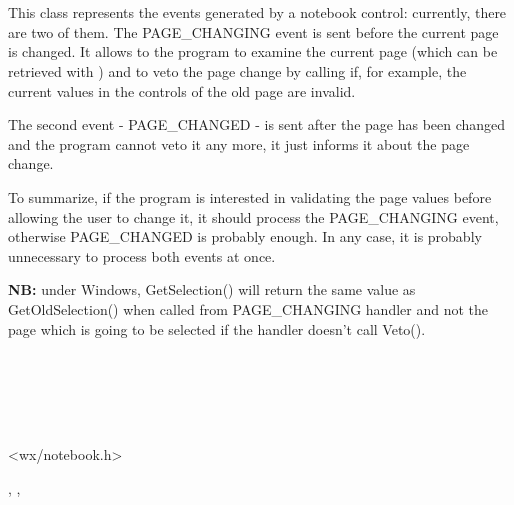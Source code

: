 \section{}\label{wxnotebookevent}

This class represents the events generated by a notebook control: currently,
there are two of them. The PAGE\_CHANGING event is sent before the current
page is changed. It allows to the program to examine the current page (which
can be retrieved with 
) and to veto the page
change by calling  if, for example, the
current values in the controls of the old page are invalid.

The second event - PAGE\_CHANGED - is sent after the page has been changed and
the program cannot veto it any more, it just informs it about the page change.

To summarize, if the program is interested in validating the page values
before allowing the user to change it, it should process the PAGE\_CHANGING
event, otherwise PAGE\_CHANGED is probably enough. In any case, it is probably
unnecessary to process both events at once.

{\bf NB:} under Windows, GetSelection() will return the same value as
GetOldSelection() when called from PAGE\_CHANGING handler and not the page
which is going to be selected if the handler doesn't call Veto().


\\
\\
\\
\\


<wx/notebook.h>




, , 


\label{wxnotebookeventconstr}


